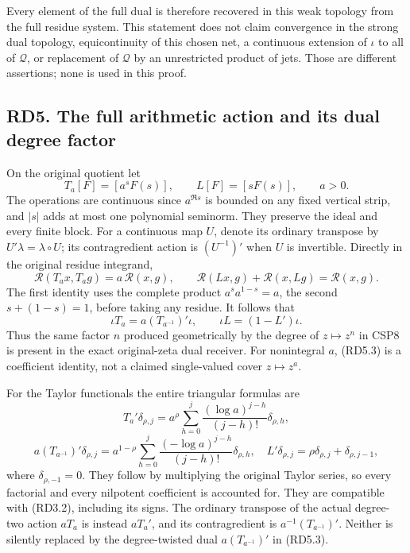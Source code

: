 Every element of the full dual is therefore recovered in this weak
topology from the full residue system. This statement does not claim
convergence in the strong dual topology, equicontinuity of this chosen
net, a continuous extension of \(\iota\) to all of \(\mathcal Q\), or
replacement of \(\mathcal Q\) by an unrestricted product of jets. Those
are different assertions; none is used in this proof.

\subsection{RD5. The full arithmetic action and its dual degree
factor}\label{rd5.-the-full-arithmetic-action-and-its-dual-degree-factor}

On the original quotient let \[
T_a[F]=[a^sF(s)],\qquad L[F]=[sF(s)],\qquad a>0.
\tag{RD5.1}
\] The operations are continuous since \(a^{\Re s}\) is bounded on any
fixed vertical strip, and \(|s|\) adds at most one polynomial seminorm.
They preserve the ideal and every finite block. For a continuous map
\(U\), denote its ordinary transpose by \(U'\lambda=\lambda\circ U\);
its contragredient action is \((U^{-1})'\) when \(U\) is invertible.
Directly in the original residue integrand, \[
\mathcal R(T_ax,T_ag)=a\,\mathcal R(x,g),\qquad
\mathcal R(Lx,g)+\mathcal R(x,Lg)=\mathcal R(x,g).
\tag{RD5.2}
\] The first identity uses the complete product \(a^s a^{1-s}=a\), the
second \(s+(1-s)=1\), before taking any residue. It follows that \[
\boxed{\iota T_a=a(T_{a^{-1}})'\iota,\qquad
\iota L=(1-L')\iota.}
\tag{RD5.3}
\] Thus the same factor \(n\) produced geometrically by the degree of
\(z\mapsto z^n\) in CSP8 is present in the exact original-zeta dual
receiver. For nonintegral \(a\), (RD5.3) is a coefficient identity, not
a claimed single-valued cover \(z\mapsto z^a\).

For the Taylor functionals the entire triangular formulas are \[
T_a'\delta_{\rho,j}
=a^\rho\sum_{h=0}^j\frac{(\log a)^{j-h}}{(j-h)!}\delta_{\rho,h},
\] \[
a(T_{a^{-1}})'\delta_{\rho,j}
=a^{1-\rho}\sum_{h=0}^j
\frac{(-\log a)^{j-h}}{(j-h)!}\delta_{\rho,h},
\quad
L'\delta_{\rho,j}=\rho\delta_{\rho,j}+\delta_{\rho,j-1},
\tag{RD5.4}
\] where \(\delta_{\rho,-1}=0\). They follow by multiplying the original
Taylor series, so every factorial and every nilpotent coefficient is
accounted for. They are compatible with (RD3.2), including its signs.
The ordinary transpose of the actual degree-two action \(aT_a\) is
instead \(aT_a'\), and its contragredient is \(a^{-1}(T_{a^{-1}})'\).
Neither is silently replaced by the degree-twisted dual
\(a(T_{a^{-1}})'\) in (RD5.3).

